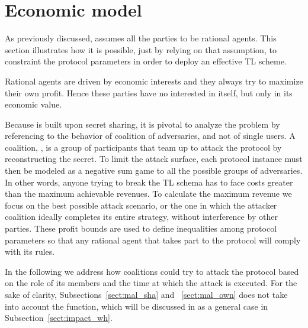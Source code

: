 \section{Economic model}\label{sect:constraints}

As previously discussed, \shortname assumes all the parties to be rational agents. 
This section illustrates how it is possible, just by relying on that assumption, to constraint the protocol parameters in order to deploy an effective TL scheme.

Rational agents are driven by economic interests and they always try to maximize their own profit. Hence these parties have no interested in \secret itself, but only in its economic value.

Because \shortname is built upon secret sharing, it is pivotal to analyze the problem by referencing to the behavior of coalition of adversaries, and not of single users.
A coalition, \coalition, is a group of participants that team up to attack the protocol by reconstructing the secret.
To limit the attack surface, each protocol instance must then be modeled as a negative sum game to all the possible groups of adversaries. 
In other words, anyone trying to break the TL schema has to face costs greater than the maximum achievable revenues. 
To calculate the maximum revenue we focus on the best possible attack scenario, or the one in which the attacker coalition ideally completes its entire strategy, without interference by other parties.
These profit bounds are used to define inequalities among protocol parameters so that any rational agent that takes part to the protocol will comply with its rules.

In the following we address how coalitions could try to attack the protocol based on the role of its members and the time at which the attack is executed.
For the sake of clarity, Subsections~\ref{sect:mal_sha} and ~\ref{sect:mal_own} does not take into account the \texttt{\algowhistleblowshare} function, which will be discussed in as a general case in Subsection~\ref{sect:impact_wh}.



